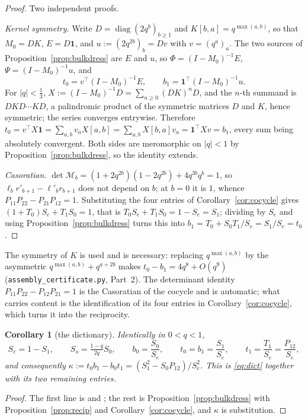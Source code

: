 \documentclass[11pt]{article}
\theoremstyle{plain}
\newtheorem{corollary}[theorem]{Corollary}
\theoremstyle{definition}
\theoremstyle{remark}
\begin{document}
\begin{proof}
Two independent proofs.

\emph{Kernel symmetry.} Write $D=\operatorname{diag}(2q^b)_{b\ge1}$ and $K[b,a]=q^{\max(a,b)}$, so
that $M_0=DK$, $E=D\mathbf 1$, and $u:=(2q^{2b})_b=Dv$ with $v=(q^a)_a$. The two sources of
Proposition~\ref{prop:bulkdress} are $E$ and $u$, so $\Phi=(I-M_0)^{-1}E$, $\Psi=(I-M_0)^{-1}u$,
and
\[
   t_0=v^{\!\top}(I-M_0)^{-1}E,\qquad b_1=\mathbf 1^{\!\top}(I-M_0)^{-1}u .
\]
For $|q|<\tfrac13$, $X:=(I-M_0)^{-1}D=\sum_{n\ge0}(DK)^nD$, and the $n$-th summand is
$DKD\cdots KD$, a palindromic product of the symmetric matrices $D$ and $K$, hence symmetric; the
series converges entrywise. Therefore
$t_0=v^{\!\top}X\mathbf 1=\sum_{a,b}v_aX[a,b]=\sum_{a,b}X[b,a]v_a=\mathbf 1^{\!\top}Xv=b_1$, every
sum being absolutely convergent. Both sides are meromorphic on $|q|<1$ by
Proposition~\ref{prop:bulkdress}, so the identity extends.

\emph{Casoratian.} $\det\mathcal M_b=(1+2q^{2b})(1-2q^{2b})+4q^{3b}q^b=1$, so
$\ell_br'_{b+1}-\ell'_br_{b+1}$ does not depend on $b$; at $b=0$ it is $1$, whence
$P_{11}P_{22}-P_{21}P_{12}=1$. Substituting the four entries of Corollary~\ref{cor:cocycle} gives
$(1+T_0)S_e+T_1S_0=1$, that is $T_0S_e+T_1S_0=1-S_e=S_1$; dividing by $S_e$ and using
Proposition~\ref{prop:bulkdress} turns this into $b_1=T_0+S_0T_1/S_e=S_1/S_e=t_0$.
\end{proof}

\noindent The symmetry of $K$ is used and is necessary: replacing $q^{\max(a,b)}$ by the
asymmetric $q^{\max(a,b)}+q^{a+2b}$ makes $t_0-b_1=4q^{8}+O(q^{9})$
(\texttt{assembly\_certificate.py}, Part~2). The determinant identity
$P_{11}P_{22}-P_{12}P_{21}=1$ is the Casoratian of the cocycle and is automatic; what carries
content is the identification of its four entries in Corollary~\ref{cor:cocycle}, which turns it
into the reciprocity.

\begin{corollary}[the dictionary]\label{cor:dict}
Identically in $0<q<1$,
\[
  S_e=1-S_1,\qquad S_o=\tfrac{1-q}{2q}S_0,\qquad b_0=\frac{S_0}{S_e},\qquad
  t_0=b_1=\frac{S_1}{S_e},\qquad t_1=\frac{T_1}{S_e}=\frac{P_{12}}{S_e},
\]
and consequently $\kappa:=t_0b_1-b_0t_1=(S_1^2-S_0P_{12})/S_e^2$. This is \eqref{eq:dict} together
with its two remaining entries.
\end{corollary}

\begin{proof}
The first line is {\cite[Proposition \textup{prop:qtrig}]{Bonfioli2026bA}} and {\cite[Lemma ``the numerators in closed form'', \textup{lem:qsinenum}]{Bonfioli2026bA}}; the rest is
Proposition~\ref{prop:bulkdress} with Proposition~\ref{prop:recip} and
Corollary~\ref{cor:cocycle}, and $\kappa$ is substitution.
\end{proof}
\end{document}
